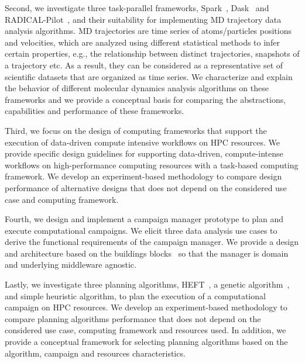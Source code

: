 Second, we investigate three task-parallel frameworks,
Spark~\cite{zaharia2010spark}, Dask~\cite{rocklin2015dask} and
RADICAL-Pilot~\cite{merzky2019using}, and their suitability for implementing
MD trajectory data analysis algorithms. MD trajectories are time series of
atoms/particles positions and velocities, which are analyzed using different
statistical methods to infer certain properties, e.g., the relationship
between distinct trajectories, snapshots of a trajectory etc. As a result,
they can be considered as a representative set of scientific datasets that are
organized as time series. We characterize and explain the behavior of
different molecular dynamics analysis algorithms on these frameworks and we
provide a conceptual basis for comparing the abstractions, capabilities and
performance of these frameworks.

Third, we focus on the design of computing frameworks that support the
execution of data-driven compute intensive workflows on HPC resources. We
provide specific design guidelines for supporting data-driven, compute-intense
workflows on high-performance computing resources with a task-based computing
framework. We develop an experiment-based methodology to compare design
performance of alternative designs that does not depend on the considered use
case and computing framework.

Fourth, we design and implement a campaign manager prototype to plan and
execute computational campaigns. We elicit three data analysis use cases to
derive the functional requirements of the campaign manager. We provide a
design and architecture based on the buildings
blocks~\cite{turilli2019middleware} so that the manager is domain and
underlying middleware agnostic.

Lastly, we investigate three planning algorithms,
HEFT~\cite{topcuoglu2002performance}, a genetic
algorithm~\cite{page2005algorithm}, and simple heuristic algorithm, to plan
the execution of a computational campaign on HPC resources. We develop an
experiment-based methodology to compare planning algorithms performance that
does not depend on the considered use case, computing framework and resources
used. In addition, we provide a conceptual framework for selecting planning
algorithms based on the algorithm, campaign and resources characteristics.

